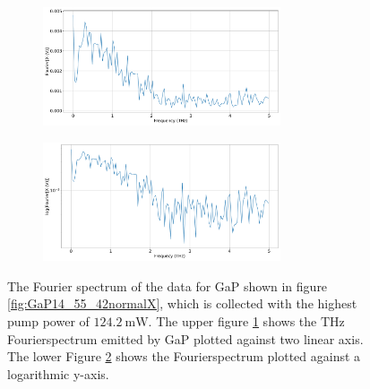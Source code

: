 \begin{figure}%
    \centering
    \begin{subfigure}{0.8\columnwidth}%
        \centering
        \includegraphics[height=3.5cm]{Plots/GaP14_55_42normalFX.pdf}%
        \label{fig:GaP14_55_42_fft}%
        \end{subfigure}%
    \hfill%
        \begin{subfigure}{0.8\columnwidth}%
        \centering
        \includegraphics[height=3.5cm]{Plots/GaP14_55_42normallog(FX).pdf}%
        \label{fig:GaP14_55_42_fft_log}%
    \end{subfigure}%
    \caption{The Fourier spectrum of the data for GaP shown in figure \ref{fig:GaP14_55_42normalX}, which is collected with the highest pump power of $\SI{124.2}{\milli\W}$.
    The upper figure \ref{fig:GaP14_55_42_fft} shows the $\si{\tera\hertz}$ Fourierspectrum emitted by GaP plotted against two linear axis.
    The lower Figure \ref{fig:GaP14_55_42_fft_log} shows the Fourierspectrum plotted against a logarithmic y-axis.}%
    \label{fig:fourier_gap}%
\end{figure}%
\FloatBarrier

